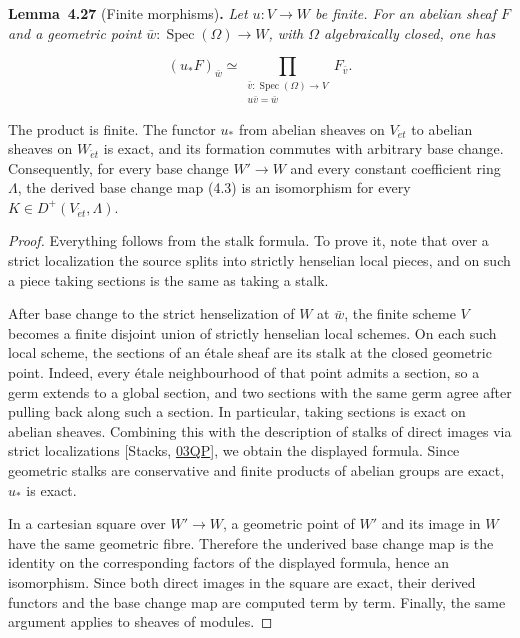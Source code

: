 \documentclass[11pt]{article}
\newenvironment{bpstatement}[2]{\par\addvspace{0.6\baselineskip}\noindent\textbf{#1}#2\textbf{.}\enspace\ignorespaces}
  {\par\addvspace{0.4\baselineskip}}
\newenvironment{bpstatementit}[2]{\begin{bpstatement}{#1}{#2}\itshape\ignorespaces}{\end{bpstatement}}
\begin{document}
\label{bp80}%
\begin{bpstatementit}{Lemma~4.27}{ (Finite morphisms)}
Let \(u:V\to W\) be finite. For an abelian sheaf \(F\) and a geometric point \(\bar w:\operatorname{Spec}(\Omega)\to W\), with \(\Omega\) algebraically closed, one has

\[
(u_*F)_{\bar w}
\simeq \prod_{\substack{\bar v:\operatorname{Spec}(\Omega)\to V\\
u\bar v=\bar w}}F_{\bar v}.
\]

The product is finite. The functor \(u_*\) from abelian sheaves on \(V_{\acute{e}t}\) to abelian sheaves on \(W_{\acute{e}t}\) is exact, and its formation commutes with arbitrary base change. Consequently, for every base change \(W'\to W\) and every constant coefficient ring \(\Lambda\), the derived base change map (4.3) is an isomorphism for every \(K\in D^+(V_{\acute{e}t},\Lambda)\).
\end{bpstatementit}

\begin{proof}[{Proof}]\label{bp81}%
Everything follows from the stalk formula. To prove it, note that over a strict localization the source splits into strictly henselian local pieces, and on such a piece taking sections is the same as taking a stalk.

After base change to the strict henselization of \(W\) at \(\bar w\), the finite scheme \(V\) becomes a finite disjoint union of strictly henselian local schemes. On each such local scheme, the sections of an étale sheaf are its stalk at the closed geometric point. Indeed, every étale neighbourhood of that point admits a section, so a germ extends to a global section, and two sections with the same germ agree after pulling back along such a section. In particular, taking sections is exact on abelian sheaves. Combining this with the description of stalks of direct images via strict localizations [Stacks, \href{https://stacks.math.columbia.edu/tag/03QP}{03QP}], we obtain the displayed formula. Since geometric stalks are conservative and finite products of abelian groups are exact, \(u_*\) is exact.

In a cartesian square over \(W'\to W\), a geometric point of \(W'\) and its image in \(W\) have the same geometric fibre. Therefore the underived base change map is the identity on the corresponding factors of the displayed formula, hence an isomorphism. Since both direct images in the square are exact, their derived functors and the base change map are computed term by term. Finally, the same argument applies to sheaves of modules.
\end{proof}
\end{document}
